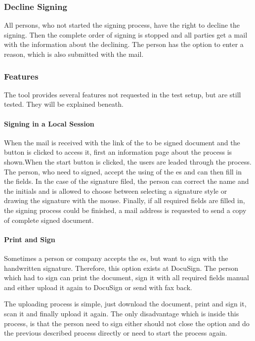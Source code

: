 \subsubsection{Decline Signing}
All persons, who not started the signing process, have the right to decline the signing. Then the complete order of signing is stopped and all parties get a mail with the information about the declining. The person has the option to enter a reason, which is also submitted with the mail.

\subsubsection{Features}
The tool provides several features not requested in the test setup, but are still tested. They will be explained beneath.
\paragraph{Signing in a Local Session}
When the mail is received with the link of the to be signed document and the button is clicked to access it, first an information page about the process is shown.When the start button is clicked, the users are leaded through the process. The person, who need to signed, accept the using of the \gls{es} and can then fill in the fields. In the case of the signature filed, the person can correct the name and the initials and is allowed to choose between selecting a signature style or drawing the signature with the mouse. Finally, if all required fields are filled in, the signing process could be finished, a mail address is requested to send a copy of complete signed document. 

\paragraph{Print and Sign}
Sometimes a person or company accepts the \gls{es}, but want to sign with the handwritten signature. Therefore, this option exists at DocuSign. The person which had to sign can print the document, sign it with all required fields manual and either upload it again to DocuSign or send with fax back.

The uploading process is simple, just download the document, print and sign it, scan it and finally upload it again. The only disadvantage which is inside this process, is that the person need to sign either should not close the option and do the previous described process directly or need to start the process again. 

